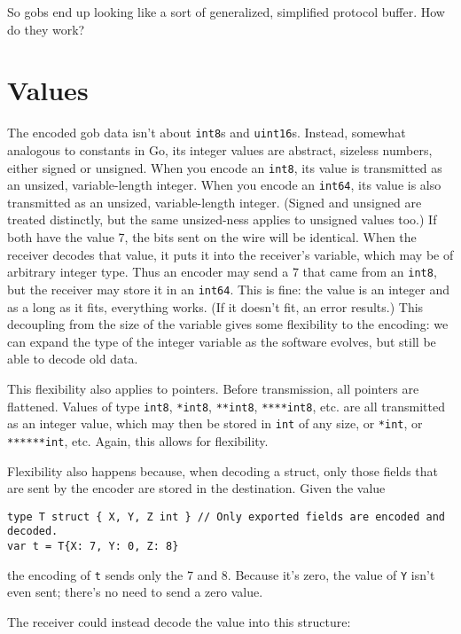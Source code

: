 So gobs end up looking like a sort of generalized, simplified protocol
buffer. How do they work?

\section*{Values}

The encoded gob data isn't about \texttt{int8}s and \texttt{uint16}s.
Instead, somewhat analogous to constants in Go, its integer values are
abstract, sizeless numbers, either signed or unsigned. When you encode
an \texttt{int8}, its value is transmitted as an unsized,
variable-length integer. When you encode an \texttt{int64}, its value is
also transmitted as an unsized, variable-length integer. (Signed and
unsigned are treated distinctly, but the same unsized-ness applies to
unsigned values too.) If both have the value 7, the bits sent on the
wire will be identical. When the receiver decodes that value, it puts it
into the receiver's variable, which may be of arbitrary integer type.
Thus an encoder may send a 7 that came from an \texttt{int8}, but the
receiver may store it in an \texttt{int64}. This is fine: the value is
an integer and as a long as it fits, everything works. (If it doesn't
fit, an error results.) This decoupling from the size of the variable
gives some flexibility to the encoding: we can expand the type of the
integer variable as the software evolves, but still be able to decode
old data.

This flexibility also applies to pointers. Before transmission, all
pointers are flattened. Values of type \texttt{int8}, \texttt{*int8},
\texttt{**int8}, \texttt{****int8}, etc. are all transmitted as an
integer value, which may then be stored in \texttt{int} of any size, or
\texttt{*int}, or \texttt{******int}, etc. Again, this allows for
flexibility.

Flexibility also happens because, when decoding a struct, only those
fields that are sent by the encoder are stored in the destination. Given
the value

\begin{Verbatim}[frame=single]
type T struct { X, Y, Z int } // Only exported fields are encoded and decoded.
var t = T{X: 7, Y: 0, Z: 8}
\end{Verbatim}

the encoding of \texttt{t} sends only the 7 and 8. Because it's zero,
the value of \texttt{Y} isn't even sent; there's no need to send a zero
value.

The receiver could instead decode the value into this structure:

